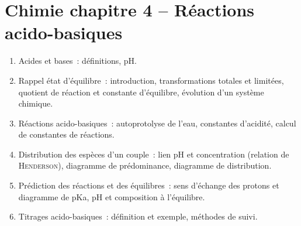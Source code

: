 \documentclass[a4paper, 12pt, final, garamond]{book}
\begin{document}
\section*{Chimie chapitre 4 -- Réactions acido-basiques}
\begin{enumerate}[label=\Roman*]
    \item{Acides et bases}~: définitions, pH.
    \item{Rappel état d'équilibre}~: introduction, transformations totales et
        limitées, quotient de réaction et constante d'équilibre, évolution d'un
        système chimique.
    \item{Réactions acido-basiques}~: autoprotolyse de l'eau, constantes
        d'acidité, calcul de constantes de réactions.
    \item{Distribution des espèces d'un couple}~: lien pH et concentration
        (relation de \textsc{Henderson}), diagramme de prédominance, diagramme
        de distribution.
    \item{Prédiction des réactions et des équilibres}~: sens d'échange des
        protons et diagramme de pKa, pH et composition à l'équilibre.
    \item{Titrages acido-basiques}~: définition et exemple, méthodes de suivi.
\end{enumerate}
\end{document}
